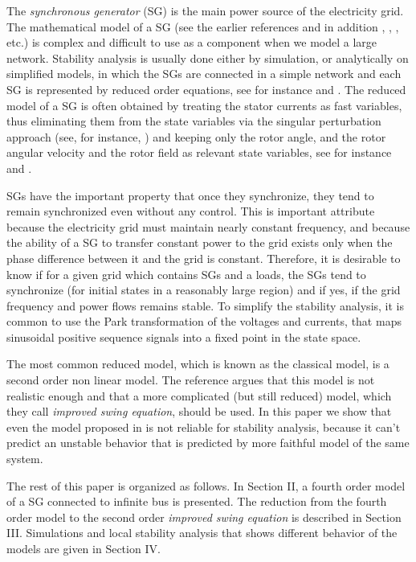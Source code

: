 \documentclass[conference]{IEEEtran}
\begin{document}
The {\em synchronous generator} (SG) is the main power source of the
electricity grid. The mathematical model of a SG (see the earlier
references and in addition \cite{Walker:94}, \cite{Fitzgerald:03},
\cite{MaWe:15}, etc.) is complex and difficult to use as a component
when we model a large network. Stability analysis is usually done
either by simulation, or analytically on simplified models, in which
the SGs are connected in a simple network and each SG is represented
by reduced order equations, see for instance \cite{DoBull:12} and
\cite{PoDoBu:13}. The reduced model of a SG is often obtained by
treating the stator currents as fast variables, thus eliminating them
from the state variables via the singular perturbation approach (see,
for instance, \cite{Khalil}) and keeping only the rotor angle, and the
rotor angular velocity and the rotor field as relevant state
variables, see for instance \cite{Kundur} and \cite{SauerPai1998}.

SGs have the important property that once they synchronize, they tend
to remain synchronized even without any control. This is important
attribute because the electricity grid must maintain nearly constant
frequency, and because the ability of a SG to transfer constant power
to the grid exists only when the phase difference between it and the
grid is constant. Therefore, it is desirable to know if for a given
grid which contains SGs and a loads, the SGs tend to synchronize (for
initial states in a reasonably large region) and if yes, if the grid
frequency and power flows remains stable. To simplify the stability
analysis, it is common to use the Park transformation of the voltages
and currents, that maps sinusoidal positive sequence signals into a
fixed point in the state space.

The most common reduced model, which is known as the classical model,
is a second order non linear model. The reference
\cite{DePersiSchaft:16} argues that this model is not realistic enough
and that a more complicated (but still reduced) model, which they call
{\em improved swing equation}, should be used. In this paper we show
that even the model proposed in \cite{DePersiSchaft:16} is not
reliable for stability analysis, because it can't predict an unstable
behavior that is predicted by more faithful model of the same system.

The rest of this paper is organized as follows. In Section II, a
fourth order model of a SG connected to infinite bus is presented. The
reduction from the fourth order model to the second order
\emph{improved swing equation} is described in Section III.
Simulations and local stability analysis that shows different behavior
of the models are given in Section IV.
\end{document}
